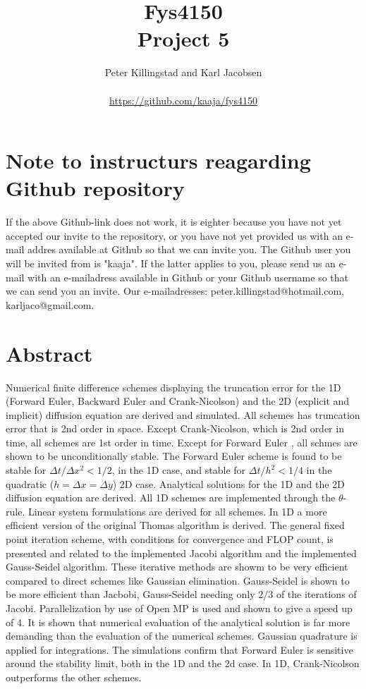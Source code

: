 \documentclass{article}
\title{Fys4150\\Project 5\\ }
\author{Peter Killingstad and Karl Jacobsen\\
\\
\url{https://github.com/kaaja/fys4150}}
\begin{document}
	
\maketitle

\section*{Note to instructurs reagarding Github repository}
If the above Github-link does not work, it is eighter because you have not yet accepted our invite to the repository, or you have not yet provided us with an e-mail addres available at Github so that we can invite you. The Github user you will be invited from is "kaaja". If the latter applies to you, please send us an e-mail with an e-mailadress available in Github or your Github username so that we can send you an invite. Our e-mailadresses: peter.killingstad@hotmail.com, karljaco@gmail.com.


\section*{Abstract}
Numerical finite difference schemes displaying the truncation error for the 1D (Forward Euler, Backward Euler and Crank-Nicolson) and the 2D (explicit and implicit) diffusion equation are derived and simulated. All schemes has truncation error that is 2nd order in space. Except Crank-Nicolson, which is 2nd order in time, all schemes are 1st order in time. Except for Forward Euler , all schmes are shown to be unconditionally stable. The Forward Euler scheme is found to be stable for $\Delta t/\Delta x^2 < 1/2$, in the 1D case, and stable for $\Delta t /h^2 < 1/4$ in the quadratic ($h = \Delta x = \Delta y$) 2D case. Analytical solutions for the 1D and the 2D diffusion equation are derived. All 1D schemes are implemented through the $\theta$-rule. Linear system formulations are derived for all schemes. In 1D a more efficient version of the original Thomas algorithm is derived. The general fixed point iteration scheme, with conditions for convergence and FLOP count, is presented and related to the implemented Jacobi algorithm and the implemented Gauss-Seidel algorithm. These iterative methods are showm to be very efficient compared to direct schemes like Gaussian elimination. Gauss-Seidel is shown to be more efficient than Jacbobi, Gauss-Seidel needing only $2/3$ of the iterations of Jacobi. Parallelization by use of Open MP is used and shown to give a speed up of 4. It is shown that numerical evaluation of the analytical solution is far more demanding than the evaluation of the numerical schemes. Gaussian quadrature is applied for integrations. The simulations confirm that Forward Euler is sensitive around the stability limit, both in the 1D and the 2d case. In 1D, Crank-Nicolson outperforms the other schemes.
\end{document}
